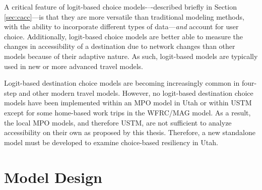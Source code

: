 A critical feature of logit-based choice models-–-described briefly in Section
\ref{sec:cacc}---is that they are more versatile than traditional modeling
methods, with the ability to incorporate different types of data---\textit{and}
account for user choice. Additionally, logit-based choice models are better
able to measure the changes in accessibility of a destination due to network
changes than other models because of their adaptive nature. As such, logit-based
models are typically used in new or more advanced travel models.

Logit-based destination choice models are becoming increasingly common in
four-step and other modern travel models. However, no logit-based destination
choice models have been implemented within an MPO model in Utah or within
USTM except for some home-based work trips in the WFRC/MAG model. As a result,
the local MPO models, and therefore USTM, are not sufficient to analyze
accessibility on their own as proposed by this thesis. Therefore, a new
standalone model must be developed to examine choice-based resiliency in Utah.

\section{Model Design} \label{Model Design}

